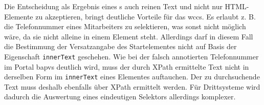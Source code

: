     Die Entscheidung als Ergebnis eines {\xpathSelector}s auch reinen Text und nicht nur
    HTML-Elemente zu akzeptieren, bringt deutliche Vorteile für das \gls{wccs}.
    Es erlaubt z. B. die Telefonnummer eines Mitarbeiters zu selektieren,
    was sonst nicht möglich wäre, da sie nicht alleine in einem Element steht.
    Allerdings darf in diesem Fall die Bestimmung der Versatzangabe des Startelementes nicht auf
    Basis der Eigenschaft \texttt{innerText} geschehen.
    Wie bei der falsch annotierten Telefonnummer im Portal \gls{bapvs} deutlich
    wird,
    muss der durch XPath ermittelte Text nicht in derselben Form im \texttt{innerText} eines Elementes auftauchen.
    Der zu durchsuchende Text muss deshalb ebenfalls über XPath ermittelt werden.
    Für Drittsysteme wird dadurch die Auswertung eines eindeutigen Selektors allerdings komplexer.
